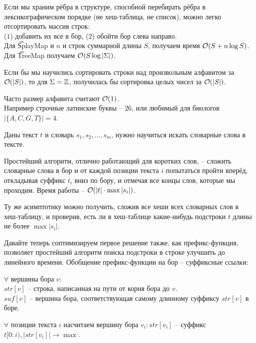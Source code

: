 
Если мы храним рёбра в структуре, способной перебирать рёбра в лексикографическом порядке (не хеш-таблица, не список),
можно легко отсортировать массив строк: \\
($1$) добавить их все в бор, ($2$) обойти бор слева направо.\\
Для \t{SplayMap} и $n$ и строк суммарной длины $S$, получаем время $\mathcal{O}(S + n \log S)$.\\
Для \t{TreeMap} получаем $\mathcal{O}(S \log |\Sigma|)$.

\begin{Rem}
Если бы мы научились сортировать строки над произвольным алфавитом за $\mathcal{O}(|S|)$, то для $\Sigma = \mathbb{Z}$,
получилась бы сортировка целых чисел за $\mathcal{O}(|S|)$.
\end{Rem}

Часто размер алфавита считают $\mathcal{O}(1)$. \\
Например строчные латинские буквы -- $26$, или любимый для биологов $|\{A, C, G, T\}| = 4$.


Даны текст $t$ и словарь $s_1, s_2, \dots, s_m$, нужно научиться искать словарные слова в тексте.

Простейший алгоритм, отлично работающий для коротких слов, -- сложить словарные слова в бор и
от каждой позиции текста $i$ попытаться пройти вперёд, откладывая суффикс $t_i$ вниз по бору, и отмечая все концы слов, которые мы проходим.
Время работы -- $\mathcal{O}(|t|\cdot\max|s_i|)$.

\down
Ту же асимптотику можно получить, сложив все хеши всех словарных слов в хеш-таблицу, и проверив, есть ли в хеш-таблице какие-нибудь подстроки
$t$ длины не более $\max|s_i|$.

\down
Давайте теперь соптимизируем первое решение также, как префикс-функция, позволяет простейший алгоритм поиска подстроки в строке улучшить до линейного 
времени. Обобщение префикс-функции на бор -- суффиксные ссылки:
\begin{Def}
$\forall$ вершины бора $v$:\\
$str[v]$ -- строка, написанная на пути от корня бора до $v$.\\
$suf[v]$ -- вершина бора, соответствующая самому длинному суффиксу $str[v]$ в боре.
\end{Def}

$\forall$ позиции текста $i$ насчитаем вершину бора $v_i \colon str[v_i]$ -- суффикс $t[0{:}i), |str[v_i]| \to \max$.

